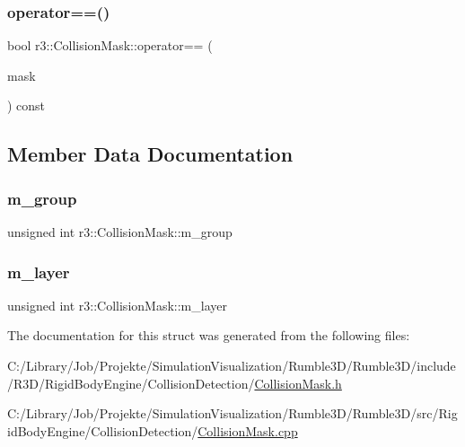 \mbox{\label{structr3_1_1_collision_mask_a7d1315f7324fc03cee09df2c364f5c54}} 
\subsubsection{\texorpdfstring{operator==()}{operator==()}}
{\footnotesize\ttfamily bool r3\+::\+Collision\+Mask\+::operator== (\begin{DoxyParamCaption}\item[{const \mbox{\hyperlink{structr3_1_1_collision_mask}{Collision\+Mask}} \&}]{mask }\end{DoxyParamCaption}) const}



\subsection{Member Data Documentation}
\mbox{\label{structr3_1_1_collision_mask_a07999f53c748c86623b00e4e07d24d5f}} 
\subsubsection{\texorpdfstring{m\+\_\+group}{m\_group}}
{\footnotesize\ttfamily unsigned int r3\+::\+Collision\+Mask\+::m\+\_\+group}

\mbox{\label{structr3_1_1_collision_mask_a4e3ed2227bb1782f7c6dc948a8427620}} 
\subsubsection{\texorpdfstring{m\+\_\+layer}{m\_layer}}
{\footnotesize\ttfamily unsigned int r3\+::\+Collision\+Mask\+::m\+\_\+layer}



The documentation for this struct was generated from the following files\+:\begin{DoxyCompactItemize}
\item 
C\+:/\+Library/\+Job/\+Projekte/\+Simulation\+Visualization/\+Rumble3\+D/\+Rumble3\+D/include/\+R3\+D/\+Rigid\+Body\+Engine/\+Collision\+Detection/\mbox{\hyperlink{_collision_mask_8h}{Collision\+Mask.\+h}}\item 
C\+:/\+Library/\+Job/\+Projekte/\+Simulation\+Visualization/\+Rumble3\+D/\+Rumble3\+D/src/\+Rigid\+Body\+Engine/\+Collision\+Detection/\mbox{\hyperlink{_collision_mask_8cpp}{Collision\+Mask.\+cpp}}\end{DoxyCompactItemize}
